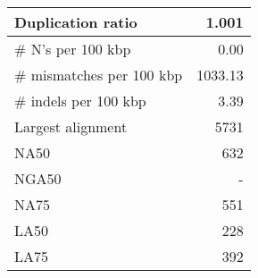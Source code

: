 \documentclass[12pt,a4paper]{article}
\begin{document}
\begin{table}[ht]
\begin{center}
\begin{tabular}{|l*{1}{|r}|}
Duplication ratio & 1.001 \\ \hline
\# N's per 100 kbp & 0.00 \\ \hline
\# mismatches per 100 kbp & 1033.13 \\ \hline
\# indels per 100 kbp & 3.39 \\ \hline
Largest alignment & 5731 \\ \hline
NA50 & 632 \\ \hline
NGA50 & - \\ \hline
NA75 & 551 \\ \hline
LA50 & 228 \\ \hline
LA75 & 392 \\ \hline
\end{tabular}
\end{center}
\end{table}
\end{document}
